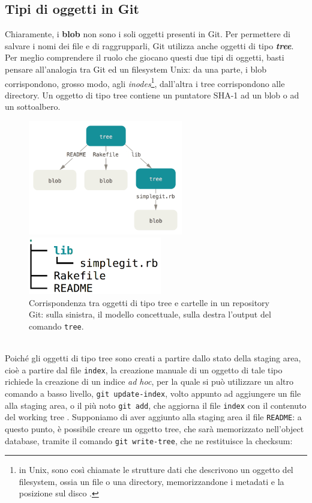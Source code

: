 \documentclass[12pt]{article}
\def\code#1{\texttt{#1}}
\begin{document}
\subsection{Tipi di oggetti in Git}
Chiaramente, i \textbf{blob} non sono i soli oggetti presenti in Git.
Per permettere di salvare i nomi dei file e di raggrupparli, Git utilizza anche oggetti di tipo \textit{\textbf{tree}}. 
Per meglio comprendere il ruolo che giocano questi due tipi di oggetti, basti pensare all'analogia tra Git ed un filesystem Unix: da una parte, i blob corrispondono, grosso modo, agli \textit{inodes}\footnote{in Unix, sono così chiamate le strutture dati che descrivono un oggetto del filesystem, ossia un file o una directory, memorizzandone i metadati e la posizione sul disco \cite{winode}.}, dall'altra i tree corrispondono alle directory. 
Un oggetto di tipo tree contiene un puntatore SHA-1 ad un blob o ad un sottoalbero.
\begin{figure}[h]
	\centering
	\begin{minipage}{7cm}
		\includegraphics[height=5cm]{data-model-graph.png}
	\end{minipage}
	\qquad
	\begin{minipage}{7cm}
		\includegraphics[height=2.5cm]{data-model-tree.png}
	\end{minipage}
	\caption{Corrispondenza tra oggetti di tipo tree e cartelle in un repository Git: sulla sinistra, il modello concettuale, sulla destra l'output del comando \code{tree}.}
\end{figure}
\bigskip \\
Poiché gli oggetti di tipo tree sono creati a partire dallo stato della staging area, cioè a partire dal file \code{index}, la creazione manuale di un oggetto di tale tipo richiede la creazione di un indice \textit{ad hoc}, per la quale si può utilizzare un altro comando a basso livello, \code{git update-index}, volto appunto ad aggiungere un file alla staging area, o il più noto \code{git add}, che aggiorna il file \code{index} con il contenuto del working tree \cite{git_ref}. Supponiamo di aver aggiunto alla staging area il file \code{README}: a questo punto, è possibile creare un oggetto tree, che sarà memorizzato nell'object database, tramite il comando \code{git write-tree}, che ne restituisce la checksum:
\end{document}
